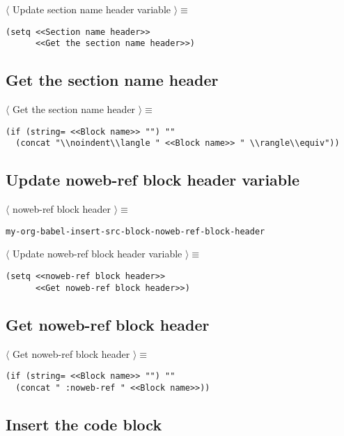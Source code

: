 \documentclass[11pt]{article}
\begin{document}
\noindent\(\langle\) Update section name header variable \(\rangle \equiv\)
\begin{verbatim}
(setq <<Section name header>>
      <<Get the section name header>>)
\end{verbatim}

\subsection{Get the section name header}
\label{sec:org313192e}

\noindent\(\langle\) Get the section name header \(\rangle \equiv\)
\begin{verbatim}
(if (string= <<Block name>> "") ""
  (concat "\\noindent\\langle " <<Block name>> " \\rangle\\equiv"))
\end{verbatim}

\subsection{Update noweb-ref block header variable}
\label{sec:orgcf8b0d1}

\noindent\(\langle\) noweb-ref block header \(\rangle \equiv\)
\begin{verbatim}
my-org-babel-insert-src-block-noweb-ref-block-header
\end{verbatim}

\noindent\(\langle\) Update noweb-ref block header variable \(\rangle \equiv\)
\begin{verbatim}
(setq <<noweb-ref block header>>
      <<Get noweb-ref block header>>)
\end{verbatim}

\subsection{Get noweb-ref block header}
\label{sec:orgaf09e42}

\noindent\(\langle\) Get noweb-ref block header \(\rangle \equiv\)
\begin{verbatim}
(if (string= <<Block name>> "") ""
  (concat " :noweb-ref " <<Block name>>))
\end{verbatim}

\subsection{Insert the code block}
\label{sec:org5a0d1fd}
\end{document}
